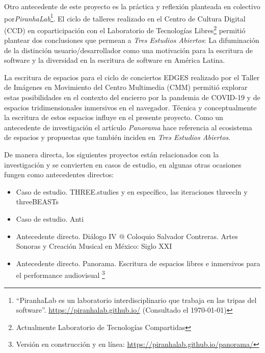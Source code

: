 Otro antecedente de este proyecto es la práctica y reflexión planteada en colectivo por\textit{PiranhaLab}\footnote{``PiranhaLab es un laboratorio interdisciplinario que trabaja en las tripas del software''. \url{https://piranhalab.github.io/} (Consultado el \today)}. El ciclo de talleres realizado en el Centro de Cultura Digital (CCD) en coparticipación con el Laboratorio de Tecnologías Libres\footnote{Actualmente Laboratorio de Tecnologías Compartidas} permitió plantear dos conclusiones que permean a \textit{Tres Estudios Abiertos}: La difuminación de la distinción usuario/desarrollador como una motivación para la escritura de software y la diversidad en la escritura de software en América Latina.

La escritura de espacios para el ciclo de conciertos EDGES realizado por el Taller de Imágenes en Movimiento del Centro Multimedia (CMM) permitió explorar estas posibilidades en el contexto del encierro por la pandemia de COVID-19 y de espacios tridimensionales inmersivos en el navegador. Técnica y conceptualmente la escritura de estos espacios influye en el presente proyecto. Como un antecedente de investigación el artículo \textit{Panorama} \citep{panoramaArticulo} hace referencia al ecosistema de espacios y propuestas que también inciden en \textit{Tres Estudios Abiertos}.


De manera directa, los siguientes proyectos están relacionados con la investigación y se convierten en casos de estudio, en algunas otras ocasiones fungen como antecedentes directos:

\begin{itemize}

\item Caso de estudio. THREE.studies \citep{threestudies} y en específico, las iteraciones threecln \citep{threecln} y threeBEASTs \citep{threeBEASTs}
\item Caso de estudio. Anti \citep{anti} 
\item Antecedente directo. Diálogo IV @ Coloquio Salvador Contreras. Artes Sonoras y Creación Musical en México: Siglo XXI \citep{dialogo}
\item Antecedente directo. Panorama. Escritura de espacios libres e inmersivos para el performance audiovisual \citep{panoramaArticulo}\footnote{Versión en construcción y en línea: \url{https://piranhalab.github.io/panorama/}}
  
\end{itemize}

